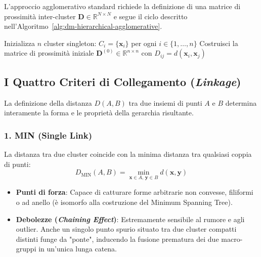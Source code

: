 L'approccio agglomerativo standard richiede la definizione di una matrice di prossimità inter-cluster $\mathbf{D} \in \mathbb{R}^{N \times N}$ e segue il ciclo descritto nell'Algoritmo~\ref{alg:dm-hierarchical-agglomerative}.

\begin{algorithm}[htbp]
\SetAlgoLined
{}
Inizializza $n$ cluster singleton: $C_i = \{\mathbf{x}_i\}$ per ogni $i \in \{1, \dots, n\}$\;
Costruisci la matrice di prossimità iniziale $\mathbf{D}^{(0)} \in \mathbb{R}^{n \times n}$ con $D_{ij} = d(\mathbf{x}_i, \mathbf{x}_j)$\;
\caption{Algoritmo gerarchico agglomerativo standard.}
\label{alg:dm-hierarchical-agglomerative}
\end{algorithm}

\FloatBarrier
\subsection{I Quattro Criteri di Collegamento (\textit{Linkage})}

La definizione della distanza $D(A, B)$ tra due insiemi di punti $A$ e $B$ determina interamente la forma e le proprietà della gerarchia risultante.

\subsubsection{1. MIN (Single Link)}
La distanza tra due cluster coincide con la minima distanza tra qualsiasi coppia di punti:
\begin{equation}
    D_{\text{MIN}}(A, B) = \min_{\mathbf{x} \in A, \, \mathbf{y} \in B} d(\mathbf{x}, \mathbf{y})
    \label{eq:dm-single-link}
\end{equation}
\begin{itemize}[noitemsep]
    \item \textbf{Punti di forza}: Capace di catturare forme arbitrarie non convesse, filiformi o ad anello (è isomorfo alla costruzione del Minimum Spanning Tree).
    \item \textbf{Debolezze (\textit{Chaining Effect})}: Estremamente sensibile al rumore e agli outlier. Anche un singolo punto spurio situato tra due cluster compatti distinti funge da "ponte", inducendo la fusione prematura dei due macro-gruppi in un'unica lunga catena.
\end{itemize}

